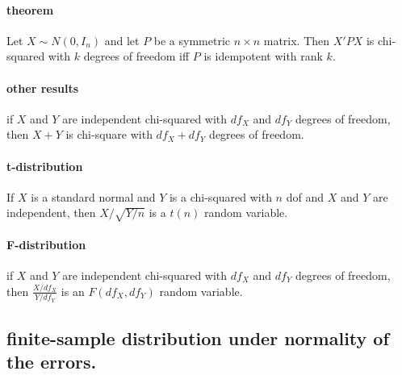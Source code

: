 \paragraph{theorem}
       Let $X \sim N(0, I_n)$ and let $P$ be a symmetric $n\times n$
       matrix.  Then $X'PX$ is chi-squared with $k$ degrees of freedom
       iff $P$ is idempotent with rank $k$.

\paragraph{other results}
if $X$ and $Y$ are independent chi-squared with $df_X$ and
         $df_Y$ degrees of freedom, then $X + Y$ is chi-square with
         $df_X + df_Y$ degrees of freedom.

\paragraph{t-distribution}
      If $X$ is a standard normal and $Y$ is a chi-squared with $n$ dof
      and $X$ and $Y$ are independent, then $X/\sqrt{Y/n}$ is a $t(n)$
      random variable.

\paragraph{F-distribution}
       if $X$ and $Y$ are independent chi-squared with $df_X$ and $df_Y$
       degrees of freedom, then $\frac{X/df_X}{Y/df_Y}$ is an $F(df_X,
       df_Y)$ random variable.

\subsection{finite-sample distribution under normality of the errors.}

